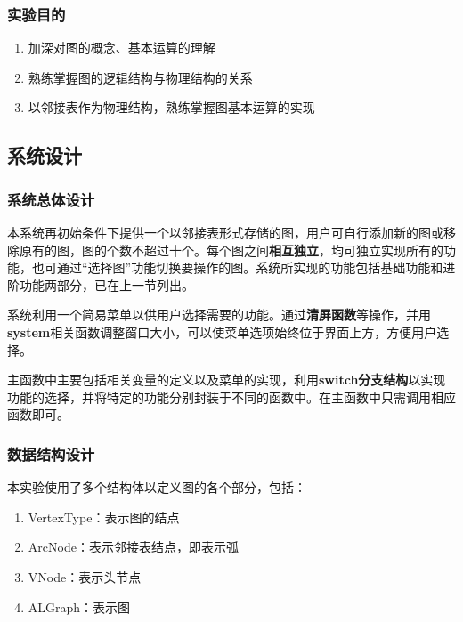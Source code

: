 \documentclass[supercite]{Experimental_Report}
\theoremstyle{definition}
\begin{document}
\subsubsection{实验目的}
\begin{enumerate}
	\item 加深对图的概念、基本运算的理解
	\item 熟练掌握图的逻辑结构与物理结构的关系
	\item 以邻接表作为物理结构，熟练掌握图基本运算的实现
\end{enumerate}


\subsection{系统设计}

\subsubsection{系统总体设计}

本系统再初始条件下提供一个以邻接表形式存储的图，用户可自行添加新的图或移除原有的图，图的个数不超过十个。每个图之间\textbf{相互独立}，均可独立实现所有的功能，也可通过“选择图”功能切换要操作的图。系统所实现的功能包括基础功能和进阶功能两部分，已在上一节列出。

系统利用一个简易菜单以供用户选择需要的功能。通过\textbf{清屏函数}等操作，并用\textbf{system}相关函数调整窗口大小，可以使菜单选项始终位于界面上方，方便用户选择。

主函数中主要包括相关变量的定义以及菜单的实现，利用\textbf{switch分支结构}以实现功能的选择，并将特定的功能分别封装于不同的函数中。在主函数中只需调用相应函数即可。

\subsubsection{数据结构设计}

本实验使用了多个结构体以定义图的各个部分，包括：
\begin{enumerate}
	\item VertexType：表示图的结点
	\item ArcNode：表示邻接表结点，即表示弧
	\item VNode：表示头节点
	\item ALGraph：表示图
\end{enumerate}
\end{document}
